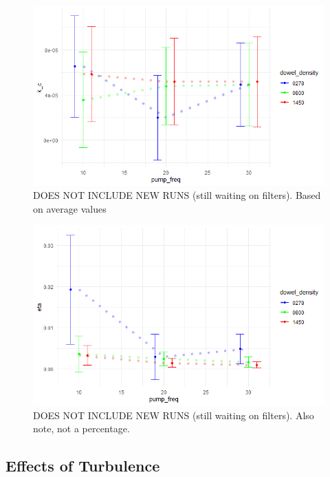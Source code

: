 \documentclass{article}
\begin{document}
\begin{figure}[H]
    \centering
    \includegraphics[width=5in]{pics/k_c.png}
    \caption{DOES NOT INCLUDE NEW RUNS (still waiting on filters). Based on average values}
    \label{fig:k_c}
\end{figure}

\begin{figure}[H]
    \centering
    \includegraphics[width=5in]{pics/eta.png}
    \caption{DOES NOT INCLUDE NEW RUNS (still waiting on filters). Also note, not a percentage.}
    \label{fig:eta}
\end{figure}

\subsection{Effects of Turbulence}
\end{document}
